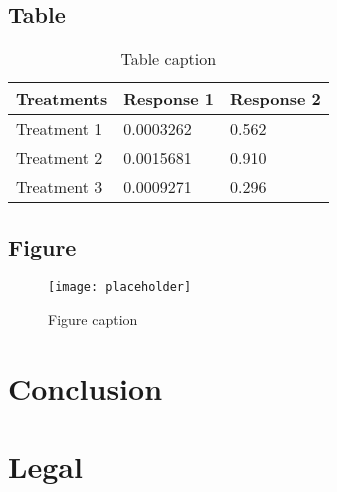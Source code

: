 \documentclass[11pt,fleqn,oneside]{book} %
\begin{document}
\section{Table}

\begin{table}[h]
	\centering
	\begin{tabular}{l l l}
		\toprule
		\textbf{Treatments} & \textbf{Response 1} & \textbf{Response 2} \\
		\midrule
		Treatment 1         & 0.0003262           & 0.562               \\
		Treatment 2         & 0.0015681           & 0.910               \\
		Treatment 3         & 0.0009271           & 0.296               \\
		\bottomrule
	\end{tabular}
	\caption{Table caption}
\end{table}


\section{Figure}

\begin{figure}[h]
	\centering\texttt{[image: placeholder]}
	\caption{Figure caption}
\end{figure}



\chapter{Conclusion}




\chapter{Legal}
\end{document}

